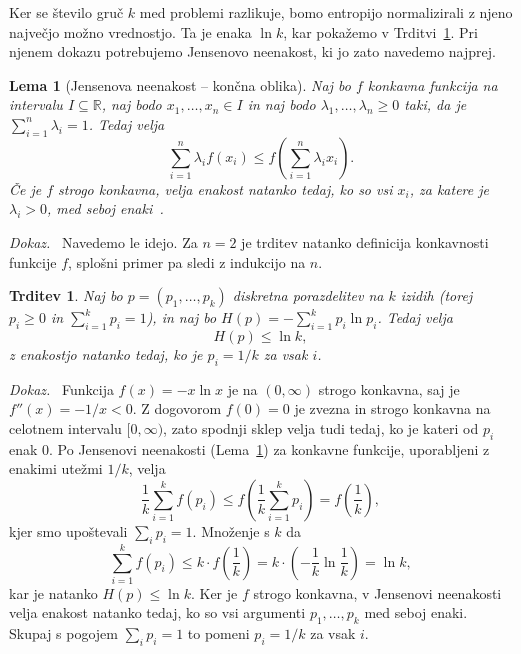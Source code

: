 \documentclass[a4paper, 12pt]{book}
\newtheorem{trditev}{Trditev}[izrek]
\newtheorem{lema}[izrek]{Lema}
\newenvironment{dokaz}{\emph{Dokaz.}\ }{\hspace{\fill}{$\Box$}}
\begin{document}
Ker se število gruč $k$ med problemi razlikuje, bomo entropijo normalizirali
z njeno največjo možno vrednostjo. Ta je enaka $\ln k$, kar pokažemo v
Trditvi~\ref{trd:entropija-max}. Pri njenem dokazu potrebujemo Jensenovo
neenakost, ki jo zato navedemo najprej.

\begin{lema}[Jensenova neenakost -- končna oblika]
\label{lema:Jensen}
Naj bo $f$ konkavna funkcija na intervalu $I \subseteq \mathbb{R}$, naj bodo
$x_1, \dots, x_n \in I$ in naj bodo $\lambda_1, \dots, \lambda_n \ge 0$ taki,
da je $\sum_{i=1}^n \lambda_i = 1$. Tedaj velja
\[
    \sum_{i=1}^{n} \lambda_i f(x_i) \le f\!\left( \sum_{i=1}^{n} \lambda_i x_i \right).
\]
Če je $f$ strogo konkavna, velja enakost natanko tedaj, ko so vsi $x_i$, za
katere je $\lambda_i > 0$, med seboj enaki~\cite[Izrek 2.6.4]{cover2006elements}.
\end{lema}

\begin{dokaz}
Navedemo le idejo. Za $n=2$ je trditev natanko definicija konkavnosti
funkcije $f$, splošni primer pa sledi z indukcijo na $n$.
\end{dokaz}


\begin{trditev}
\label{trd:entropija-max}
Naj bo $p = (p_1, \dots, p_k)$ diskretna porazdelitev na $k$ izidih 
(torej $p_i \ge 0$ in $\sum_{i=1}^k p_i = 1$), in naj bo
$H(p) = -\sum_{i=1}^k p_i \ln p_i$. Tedaj velja
\[
    H(p) \le \ln k,
\]
z enakostjo natanko tedaj, ko je $p_i = 1/k$ za vsak $i$.
\end{trditev}

\begin{dokaz}
Funkcija $f(x) = -x \ln x$ je na $(0, \infty)$ strogo konkavna, saj je
$f''(x) = -1/x < 0$. Z dogovorom $f(0) = 0$ je zvezna in strogo konkavna na
celotnem intervalu $[0, \infty)$, zato spodnji sklep velja tudi tedaj, ko je kateri od
$p_i$ enak 0. Po Jensenovi neenakosti (Lema~\ref{lema:Jensen}) za konkavne funkcije, uporabljeni
z enakimi utežmi $1/k$, velja
\[
    \frac{1}{k} \sum_{i=1}^{k} f(p_i) \le f\!\left( \frac{1}{k} \sum_{i=1}^{k} p_i \right)
    = f\!\left(\frac{1}{k}\right),
\]
kjer smo upoštevali $\sum_i p_i = 1$. Množenje s $k$ da
\[
    \sum_{i=1}^{k} f(p_i) \le k \cdot f\!\left(\frac{1}{k}\right)
    = k \cdot \left(- \frac{1}{k} \ln \frac{1}{k}\right) = \ln k,
\]
kar je natanko $H(p) \le \ln k$. Ker je $f$ strogo konkavna, v Jensenovi
neenakosti velja enakost natanko tedaj, ko so vsi argumenti $p_1, \dots, p_k$
med seboj enaki. Skupaj s pogojem $\sum_i p_i = 1$ to pomeni $p_i = 1/k$ za
vsak $i$.
\end{dokaz}
\end{document}

